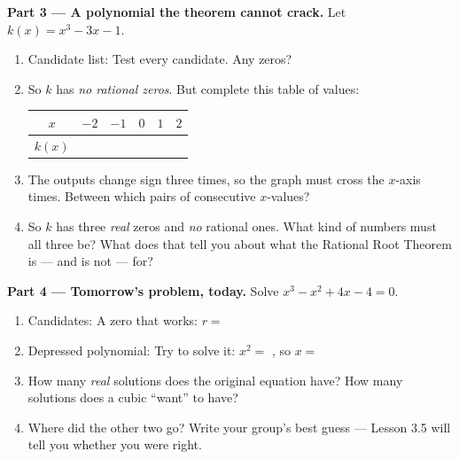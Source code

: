 \documentclass[10pt]{article}
\begin{document}
\begin{tcolorbox}[colback=white, colframe=black!40, title=\textbf{Tier E --- Extension},
    fonttitle=\bfseries, arc=1.5mm, left=3mm, right=3mm, top=2mm, bottom=2mm, breakable]
\vspace{5pt}
\textbf{Part 3 --- A polynomial the theorem cannot crack.} Let $k(x) = x^3 - 3x - 1$.
\begin{enumerate}[label=(\alph*), leftmargin=1.8em, itemsep=6pt]
  \item Candidate list: \blank{2.4cm} \; Test every candidate. Any zeros? \blank{1.2cm}
  \item So $k$ has \emph{no rational zeros}. But complete this table of values:
    \begin{center}
    \renewcommand{\arraystretch}{1.4}
    \begin{tabular}{|c|C{1.3cm}|C{1.3cm}|C{1.3cm}|C{1.3cm}|C{1.3cm}|}
    \hline
    $x$ & $-2$ & $-1$ & $0$ & $1$ & $2$ \\ \hline
    $k(x)$ & & & & & \\ \hline
    \end{tabular}
    \end{center}
  \item The outputs change sign three times, so the graph must cross the $x$-axis
        \blank{1.2cm} times. Between which pairs of consecutive $x$-values?
        \blank{4.6cm}
  \item So $k$ has three \emph{real} zeros and \emph{no} rational ones. What kind of numbers must
        all three be? \blank{3.0cm} \; What does that tell you about what the Rational Root Theorem
        is --- and is not --- for? 
\end{enumerate}

\vspace{5pt}
\textbf{Part 4 --- Tomorrow's problem, today.} Solve $x^3 - x^2 + 4x - 4 = 0$.
\begin{enumerate}[label=(\alph*), leftmargin=1.8em, itemsep=6pt]
  \item Candidates: \blank{3.4cm} \; A zero that works: $r = $ \blank{1.0cm}
  \item Depressed polynomial: \blank{2.4cm} \; Try to solve it: $x^2 = $ \blank{1.4cm}, so
        $x = $ \blank{2.4cm}
  \item How many \emph{real} solutions does the original equation have? \blank{1.0cm} \;
        How many solutions does a cubic ``want'' to have? \blank{1.0cm}
  \item Where did the other two go? Write your group's best guess --- Lesson 3.5 will tell you
        whether you were right. 
\end{enumerate}
\end{tcolorbox}
\end{document}
